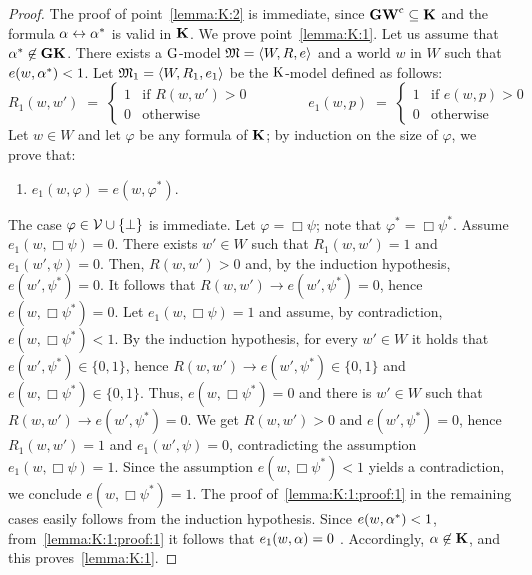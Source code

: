 \begin{proof}
The  proof of point~\ref{lemma:K:2} is immediate, since
  $\mathbf{GW}^\mathrm{c}\subseteq \mathbf{K}$ and the formula  $\alpha\leftrightarrow \alpha^*$  is valid in  $\mathbf{K}$.
  We prove  point~\ref{lemma:K:1}. Let us assume that $\alpha^*\not\in \mathbf{GK}$.
  There exists a $\mbox{$\mathrm{G}$}$-model $\mathfrak{M}=\langle W,R,e \rangle$ and  a world $w$ in $W$ such that $e(w,\alpha^*)< 1$.
Let $\mathfrak{M}_1=\langle W,R_1,e_1 \rangle$ be the   $\mbox{$\mathrm{K}$}$-model  defined as follows:
\[
  R_1(w,w')\;=\;
  \begin{cases}
  1 &\text{if $R(w,w') > 0$}  
    \\
 0 & \text{otherwise}   
  \end{cases}
\hspace{4em}
  e_1(w,p)\;=\;
  \begin{cases}
  1 &\text{if $e(w,p) > 0$}  
    \\
 0 & \text{otherwise} 
\end{cases}
 \]  
 Let $w\in W$ and let $\varphi$ be any formula  of $\mathbf{K}$; by induction on the size of $\varphi$, we prove that:
 \begin{enumerate}[label=(\Alph*), ref=(\Alph*),leftmargin=*]    
 \item\label{lemma:K:1:proof:1}
   $e_1(w,\varphi)= e(w,\varphi^*)$.
 \end{enumerate}
 The  case  $\varphi\in\mathcal{V}\cup\{\bot\}$ is immediate.
  Let $\varphi = \Box \psi$;
note that $\varphi^*=\Box \psi^*$.
 Assume $e_1(w,  \Box \psi)=0$.
 There exists $w'\in W$ such that $R_1(w,w')=1$ and $e_1(w',   \psi)=0$.
 Then,  $R(w,w')>0$ and, by the induction hypothesis,   $e(w',   \psi^*)=0$.
 It follows that $R(w,w')\to e(w',   \psi^*)=0$, hence  $e(w,  \Box \psi^*)=0$.
 Let $e_1(w,  \Box \psi)=1$ and assume, by contradiction,  $e(w,  \Box \psi^*) <  1$.
 By the induction hypothesis,  for every $w' \in W$ it holds that  $e(w',\psi^*)\in\{0,1\}$,
 hence  $R(w,w')\to e(w',\psi^*) \in \{0,1\}$ and  $e(w,  \Box \psi^*) \in \{0, 1\}$.
 Thus,   $e(w,  \Box \psi^*) =  0$ and
 there is  $w'\in W$ such that  $R(w,w')\to e(w',\psi^*) = 0$.
 We get   $R(w,w') > 0$ and  $e(w',\psi^*)=0$,
 hence $R_1(w,w') = 1$ and  $e_1(w',  \psi)=0$,
 contradicting the assumption  $e_1(w,  \Box \psi)=1$.
Since the assumption $e(w,  \Box \psi^*) <  1$ yields a contradiction, 
 we conclude    $e(w,  \Box \psi^*) = 1$.
The proof of~\ref{lemma:K:1:proof:1} in the remaining cases easily follows from the induction hypothesis.
Since  $e(w,\alpha^*)< 1$, from~\ref{lemma:K:1:proof:1} it follows that
$e_1(w,\alpha) = 0$ . Accordingly, $\alpha\not\in\mathbf{K}$,
and this proves~\ref{lemma:K:1}.
\end{proof}


